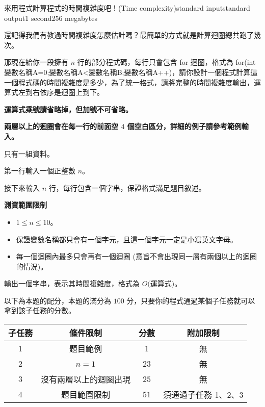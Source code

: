 \begin{problem}{來用程式計算程式的時間複雜度吧！(Time complexity)}{standard input}{standard output}{1 second}{256 megabytes}

還記得我們有教過時間複雜度怎麼估計嗎？最簡單的方式就是計算迴圈總共跑了幾次。

那現在給你一段擁有 $n$ 行的部分程式碼，每行只會包含 for 迴圈，格式為 for(int 變數名稱A=0;變數名稱A<變數名稱B;變數名稱A++)，請你設計一個程式計算這一個程式碼的時間複雜度是多少，為了統一格式，請將完整的時間複雜度輸出，運算式左到右依序是迴圈上到下。

\textbf{運算式乘號請省略掉，但加號不可省略。}

\textbf{兩層以上的迴圈會在每一行的前面空 $4$ 個空白區分，詳細的例子請參考範例輸入。}

\InputFile
只有一組資料。

第一行輸入一個正整數 $n$。

接下來輸入 $n$ 行，每行包含一個字串，保證格式滿足題目敘述。

\textbf{測資範圍限制}

\begin{itemize}

\item $ 1 \le n \le 10$。

\item 保證變數名稱都只會有一個字元，且這一個字元一定是小寫英文字母。

\item 每一個迴圈內最多只會再有一個迴圈 (意旨不會出現同一層有兩個以上的迴圈的情況)。

\end{itemize}

\OutputFile
輸出一個字串，表示其時間複雜度，格式為 $O($運算式$)$。

\Scoring
以下為本題的配分，本題的滿分為 $100$ 分，只要你的程式通過某個子任務就可以拿到該子任務的分數。

\begin{center}
  \begin{tabular}{ | c | c | c | c | } \hline
    \bf{子任務} &
    \bf{條件限制} &
    \bf{分數} &
    \bf{附加限制} \\ \hline
    $1$ & 題目範例 & $1$ & 無 \\ \hline
    $2$ & $n = 1$ & $23$ & 無 \\ \hline
    $3$ & 沒有兩層以上的迴圈出現 & $25$ & 無 \\ \hline
    $4$ & 題目範圍限制 & $51$ & 須通過子任務 1、2、3 \\ \hline
    \end{tabular}
\end{center}

\Examples

\begin{example}
%
%
%
%
\end{example}

\end{problem}

